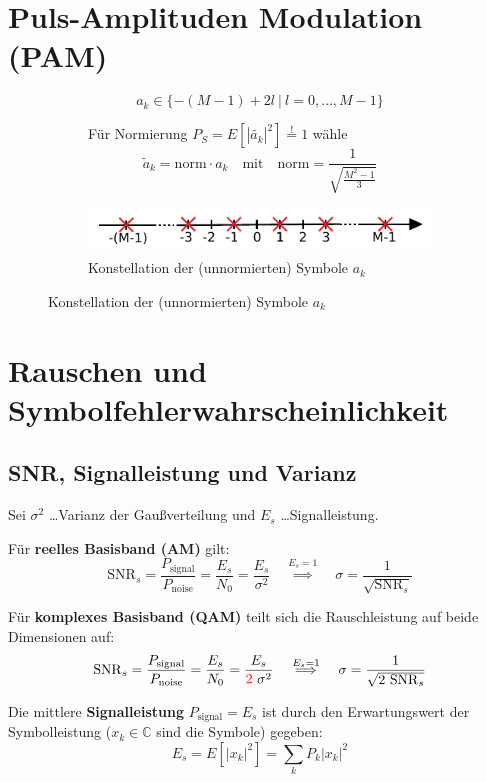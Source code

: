 \documentclass[a4paper, 11pt]{article}
\begin{document}
\section*{Puls-Amplituden Modulation (PAM)}
\begin{figure}[H]
	\begin{subfigure}{0.54\textwidth}
		\[
			a_{k} \in \{-(M - 1) + 2l ~ | ~ l = 0, \ldots, M-1\}
		\]

		Für Normierung $P_S = E \left[|\tilde{a_k}|^2 \right] \overset{!}{=} 1$ wähle
		\[
			\tilde a_k = \mathrm{norm} \cdot a_k \quad \text{mit} \quad \mathrm{norm} = \frac{1}{\sqrt{\frac{M^2 - 1}{3}}}
		\]
	\end{subfigure}
	\begin{subfigure}{0.45\textwidth}
		\includegraphics[width=\textwidth]{img/pamconstellation.pdf}
		\caption*{Konstellation der (unnormierten) Symbole $a_k$}
	\end{subfigure}
\end{figure}

\section*{Rauschen und Symbolfehlerwahrscheinlichkeit}
\subsection*{SNR, Signalleistung und Varianz}
Sei $\sigma^2$ \ldots Varianz der Gaußverteilung und $E_s$ \ldots Signalleistung.

\raggedright
Für \textbf{reelles Basisband (AM)} gilt:
\[
	\mathrm{SNR}_s = \frac{P_\mathrm{signal}}{P_\mathrm{noise}} = \frac{E_s}{N_0} = \frac{E_s}{\sigma^2} \quad \overset{E_s = 1}{\implies} \quad \sigma = \frac{1}{\sqrt{\mathrm{SNR}_s}}
\]

\raggedright
Für \textbf{komplexes Basisband (QAM)} teilt sich die Rauschleistung auf beide Dimensionen auf:
\[
	\mathrm{SNR}_s = \frac{P_\mathrm{signal}}{P_\mathrm{noise}} = \frac{E_s}{N_0} = \frac{E_s}{{\color{red} 2} ~ \sigma^2} \quad \overset{E_s = 1}{\implies} \quad \sigma = \frac{1}{\sqrt{2 ~ \mathrm{SNR}_s}}
\]

\raggedright
Die mittlere \textbf{Signalleistung} $P_\mathrm{signal} = E_s$ ist durch den Erwartungswert der Symbolleistung ($x_k \in \mathbb C$ sind die Symbole) gegeben:
\[
	E_s = E[|x_k|^2] = \sum_k P_k |x_k|^2
\]
\end{document}
